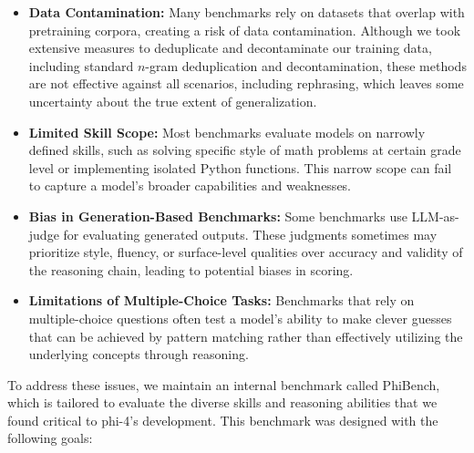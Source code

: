 \documentclass[11pt]{article}
\newcommand{\modelwithoutspace}{\textsf{phi-4}}
\begin{document}
\begin{itemize}
    \item \textbf{Data Contamination:} Many benchmarks rely on datasets that overlap with pretraining corpora, creating a risk of data contamination. Although we took extensive measures to deduplicate and decontaminate our training data, including standard $n$-gram deduplication and decontamination, these methods are not effective against all scenarios, including rephrasing, which leaves some uncertainty about the true extent of generalization.
    \item \textbf{Limited Skill Scope:} Most benchmarks evaluate models on narrowly defined skills, such as solving specific style of math problems at certain grade level or implementing isolated Python functions. This narrow scope can fail to capture a model’s broader capabilities and weaknesses.
    \item \textbf{Bias in Generation-Based Benchmarks:} Some benchmarks use LLM-as-judge for evaluating generated outputs. These judgments sometimes may prioritize style, fluency, or surface-level qualities over accuracy and validity of the reasoning chain, leading to potential biases in scoring.
    \item \textbf{Limitations of Multiple-Choice Tasks:} Benchmarks that rely on multiple-choice questions often test a model’s ability to make clever guesses that can be achieved by pattern matching rather than effectively utilizing the underlying concepts through reasoning.
\end{itemize}

To address these issues, we maintain an internal benchmark called {PhiBench}, which is tailored to evaluate the diverse skills and reasoning abilities that we found critical to \modelwithoutspace’s development. This benchmark was designed with the following goals:
\end{document}
